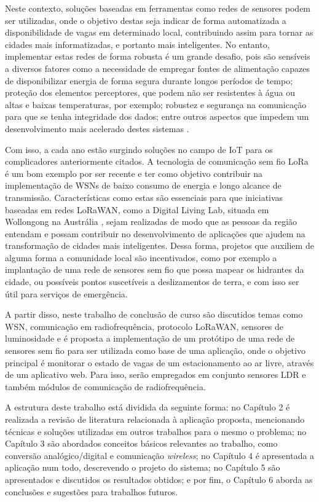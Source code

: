 \documentclass[oneside,openright,12pt]{ufsm_2015} %
\begin{document}
{Neste contexto, soluções baseadas em ferramentas como redes de sensores podem ser utilizadas, onde o objetivo destas seja indicar de forma automatizada a disponibilidade de vagas em determinado local, contribuindo assim para tornar as cidades mais informatizadas, e portanto mais inteligentes. No entanto, implementar estas redes de forma robusta é um grande desafio, pois são sensíveis a diversos fatores como a necessidade de empregar fontes de alimentação capazes de disponibilizar energia de forma segura durante longos períodos de tempo; proteção dos elementos perceptores, que podem não ser resistentes à água ou altas e baixas temperaturas, por exemplo; robustez e segurança na comunicação para que se tenha integridade dos dados; entre outros aspectos que impedem um desenvolvimento mais acelerado destes sistemas \cite{puccinelli2005wireless}. 

Com isso, a cada ano estão surgindo soluções no campo de IoT para os complicadores anteriormente citados. A tecnologia de comunicação sem fio LoRa é um bom exemplo por ser recente e ter como objetivo contribuir na implementação de WSNs de baixo consumo de energia e longo alcance de transmissão. Características como estas são essenciais para que iniciativas baseadas em redes LoRaWAN, como a Digital Living Lab, situada em Wollongong na Austrália \cite{site:dll}, sejam realizadas de modo que as pessoas da região entendam e possam contribuir no desenvolvimento de aplicações que ajudem na transformação de cidades mais inteligentes. Dessa forma, projetos que auxiliem de alguma forma a comunidade local são incentivados, como por exemplo a implantação de uma rede de sensores sem fio que possa mapear os hidrantes da cidade, ou possíveis pontos suscetíveis a deslizamentos de terra, e com isso ser útil para serviços de emergência.

A partir disso, neste trabalho de conclusão de curso são discutidos temas como WSN, comunicação em radiofrequência, protocolo LoRaWAN, sensores de luminosidade e é proposta a implementação de um protótipo de uma rede de sensores sem fio para ser utilizada como base de uma aplicação, onde o objetivo principal é monitorar o estado de vagas de um estacionamento ao ar livre, através de um aplicativo web. Para isso, serão empregados em conjunto sensores LDR e também módulos de comunicação de radiofrequência.

A estrutura deste trabalho está dividida da seguinte forma: no Capítulo 2 é realizada a revisão de literatura relacionada à aplicação proposta, mencionando técnicas e soluções utilizadas em outros trabalhos para o mesmo o problema; no Capítulo 3 são abordados conceitos básicos relevantes ao trabalho, como conversão analógico/digital e comunicação \textit{wireless}; no Capítulo 4 é apresentada a aplicação num todo, descrevendo o projeto do sistema; no Capítulo 5 são apresentados e discutidos os resultados obtidos; e por fim, o Capítulo 6 aborda as conclusões e sugestões para trabalhos futuros.
}%
\geraintro  %
\end{document}
